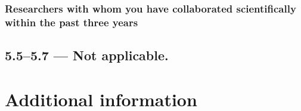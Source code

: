 \documentclass{dfg_en}
\newcommand{\emptyheading}{ \mdseries--- Not applicable.}
\begin{document}
\subsubsection{Researchers with whom you have collaborated scientifically within the past three years}


%

\subsection*{5.5--5.7\emptyheading}



\section{Additional information}

\end{document}
